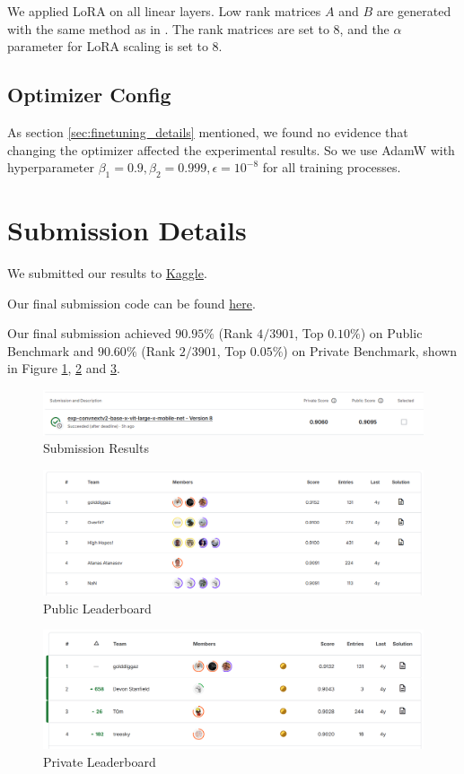 We applied LoRA on all linear layers. Low rank matrices $A$ and $B$ are generated with the same method as in \cite{buyukakyuz2024olora}. The rank matrices are set to $8$, and the $\alpha$ parameter for LoRA scaling is set to $8$.

\subsection{Optimizer Config}\label{appendix:optimizer_config}

As section \ref{sec:finetuning_details} mentioned, we found no evidence that changing the optimizer affected the experimental results. So we use AdamW with hyperparameter $\beta_1=0.9, \beta_2=0.999, \epsilon=10^{-8}$ for all training processes.

\section{Submission Details}\label{app:submission_details}

We submitted our results to \href{https://www.kaggle.com/competitions/cassava-leaf-disease-classification/submissions}{Kaggle}.

Our final submission code can be found \href{https://github.com/pufanyi/SC4000/blob/main/submission/final_submission.ipynb}{here}.

Our final submission achieved $90.95\%$ (Rank $4 / 3901$, Top $0.10\%$) on Public Benchmark and $90.60\%$ (Rank $2 / 3901$, Top $0.05\%$) on Private Benchmark, shown in Figure \ref{fig:submission}, \ref{fig:public_lb} and \ref{fig:private_lb}.

\begin{figure}[H]
    \centering
    \includegraphics[width=1\linewidth]{graphs/appendix/results.png}
    \caption{Submission Results}
    \label{fig:submission}
\end{figure}

\begin{figure}[H]
    \centering
    \includegraphics[width=1\linewidth]{graphs/appendix/publiclb.png}
    \caption{Public Leaderboard}
    \label{fig:public_lb}
\end{figure}

\begin{figure}[H]
    \centering
    \includegraphics[width=1\linewidth]{graphs/appendix/privatelb.png}
    \caption{Private Leaderboard}
    \label{fig:private_lb}
\end{figure}